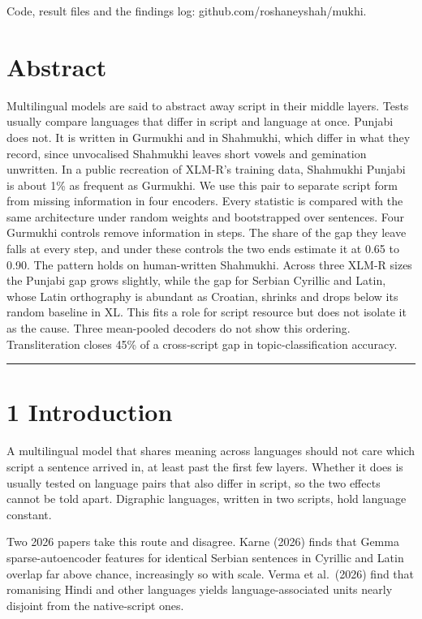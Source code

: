 Code, result files and the findings log: github.com/roshaneyshah/mukhi.

\hypertarget{abstract}{%
\section{Abstract}\label{abstract}}

Multilingual models are said to abstract away script in their middle
layers. Tests usually compare languages that differ in script and
language at once. Punjabi does not. It is written in Gurmukhi and in
Shahmukhi, which differ in what they record, since unvocalised Shahmukhi
leaves short vowels and gemination unwritten. In a public recreation of
XLM-R's training data, Shahmukhi Punjabi is about 1\% as frequent as
Gurmukhi. We use this pair to separate script form from missing
information in four encoders. Every statistic is compared with the same
architecture under random weights and bootstrapped over sentences. Four
Gurmukhi controls remove information in steps. The share of the gap they
leave falls at every step, and under these controls the two ends
estimate it at 0.65 to 0.90. The pattern holds on human-written
Shahmukhi. Across three XLM-R sizes the Punjabi gap grows slightly,
while the gap for Serbian Cyrillic and Latin, whose Latin orthography is
abundant as Croatian, shrinks and drops below its random baseline in XL.
This fits a role for script resource but does not isolate it as the
cause. Three mean-pooled decoders do not show this ordering.
Transliteration closes 45\% of a cross-script gap in
topic-classification accuracy.

\begin{center}\rule{0.5\linewidth}{0.5pt}\end{center}

\hypertarget{introduction}{%
\section{1 Introduction}\label{introduction}}

A multilingual model that shares meaning across languages should not
care which script a sentence arrived in, at least past the first few
layers. Whether it does is usually tested on language pairs that also
differ in script, so the two effects cannot be told apart. Digraphic
languages, written in two scripts, hold language constant.

Two 2026 papers take this route and disagree. Karne (2026) finds that
Gemma sparse-autoencoder features for identical Serbian sentences in
Cyrillic and Latin overlap far above chance, increasingly so with scale.
Verma et al.~(2026) find that romanising Hindi and other languages
yields language-associated units nearly disjoint from the native-script
ones.

